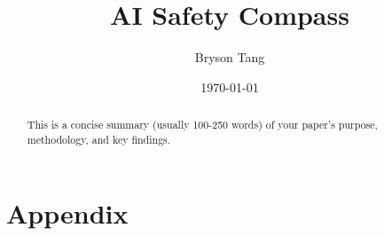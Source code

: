 \documentclass[11pt]{article}
\title{AI Safety Compass}
\author{Bryson Tang}
\date{\today}
\begin{document}
\maketitle

\begin{abstract}
This is a concise summary (usually 100-250 words) of your paper's purpose, methodology, and key findings.
\end{abstract}













\newpage



\newpage
\appendix
\section*{Appendix}

\end{document}
